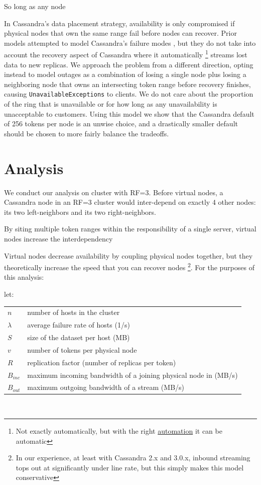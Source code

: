\documentclass{article}
\makeatletter
\newenvironment{conditions}[1][let:]
  {#1 \begin{tabular}[t]{>{$}l<{$} @{${}={}$} l}}
  {\end{tabular}\\[\belowdisplayskip]}
\makeatother
\begin{document}
So long as any node


In Cassandra's data placement strategy, availability is only compromised if
physical nodes that own the same range fail before nodes can recover. Prior
models attempted to model Cassandra's failure modes \cite{dataloss}, but they
do not take into account the recovery aspect of Cassandra where it
automatically \footnote{Not exactly automatically, but with the right
\href{https://github.com/Netflix/Priam}{automation} it can be automatic}
streams lost data to new replicas. We approach the problem from a different
direction, opting instead to model outages as a combination of losing a single
node plus losing a neighboring node that owns an intersecting token range
before recovery finishes, causing \texttt{UnavailableExceptions} to clients. We
do not care about the proportion of the ring that is unavailable or for how
long as any unavailability is unacceptable to customers. Using this model we
show that the Cassandra default of 256 tokens per node is an unwise choice, and
a drastically smaller default should be chosen to more fairly balance the
tradeoffs.

\section{Analysis}

We conduct our analysis on cluster with RF=3. Before virtual nodes, a Cassandra
node in an RF=3 cluster would inter-depend on exactly 4 other nodes: its two
left-neighbors and its two
right-neighbors.

By siting multiple token ranges within the responsibility of a single server,
virtual nodes increase the interdependency

Virtual nodes decrease availability by coupling physical nodes together, but
they theoretically increase the speed that you can recover nodes \footnote{In
our experience, at least with Cassandra 2.x and 3.0.x, inbound streaming tops
out at significantly under line rate, but this simply makes this model
conservative}. For the purposes of this analysis:

\begin{conditions}
 n       &  number of hosts in the cluster \\
 \lambda &  average failure rate of hosts (1/s) \\
 S       &  size of the dataset per host (MB) \\
 v       &  number of tokens per physical node \\
 R       &  replication factor (number of replicas per token) \\
 B_{inc} &  maximum incoming bandwidth of a joining physical node in (MB/s) \\
 B_{out} &  maximum outgoing bandwidth of a stream (MB/s) \\
\end{conditions}
\end{document}
